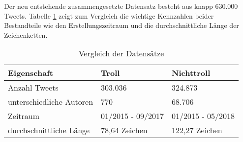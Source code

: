 Der neu entstehende zusammengesetzte Datensatz besteht aus knapp 630.000 Tweets. 
Tabelle \ref{tab_datasets} zeigt zum Vergleich die wichtige Kennzahlen beider Bestandteile wie den Erstellungszeitraum und die durchschnittliche Länge der Zeichenketten.
\begin{table}[htb]
	\begin{center}
		\begin{tabular}{|l|l|l|}
			\hline
		Eigenschaft					& Troll		& Nichttroll\\ \hline \hline
		Anzahl Tweets   			& 303.036	& 324.873	\\ \hline
		unterschiedliche Autoren    & 770		& 68.706		\\ \hline
		Zeitraum					& 01/2015 - 09/2017& 01/2015 - 05/2018\\ \hline
		durchschnittliche Länge		& 78,64 Zeichen	& 122,27 Zeichen\\ \hline
		\end{tabular}
		\caption{Vergleich der Datensätze}\label{tab_datasets}
	\end{center}
\end{table}
\pagebreak